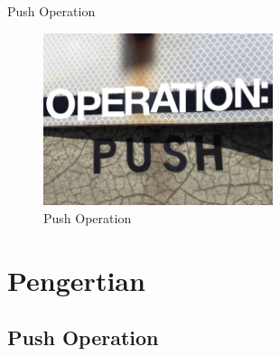 
\sloppy
\begin{center}{\fontsize{16pt}{16pt}\selectfont Push Operation \\}\end{center} \par


\begin{figure}[ht]
	\centerline{\includegraphics[width=0.60\textwidth]{Figures/dapgit3.jpg}}
	\caption{Push Operation}
	\label{Push Operation}
\end{figure}





\section {Pengertian }
\subsection {Push Operation}



